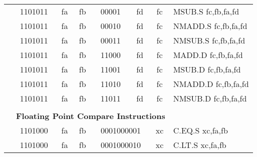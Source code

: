 \begin{table}[p]
\begin{small}
\begin{center}
\begin{tabular}{rcccccccccl}
&
\multicolumn{2}{|c|}{1101011} &
\multicolumn{1}{c|}{fa} &
\multicolumn{1}{c|}{fb} &
\multicolumn{2}{c|}{00001} &
\multicolumn{2}{c|}{fd} &
\multicolumn{1}{c|}{fc} & MSUB.S fc,fb,fa,fd \\
\cline{2-10}
  

&
\multicolumn{2}{|c|}{1101011} &
\multicolumn{1}{c|}{fa} &
\multicolumn{1}{c|}{fb} &
\multicolumn{2}{c|}{00010} &
\multicolumn{2}{c|}{fd} &
\multicolumn{1}{c|}{fc} & NMADD.S fc,fb,fa,fd \\
\cline{2-10}
  

&
\multicolumn{2}{|c|}{1101011} &
\multicolumn{1}{c|}{fa} &
\multicolumn{1}{c|}{fb} &
\multicolumn{2}{c|}{00011} &
\multicolumn{2}{c|}{fd} &
\multicolumn{1}{c|}{fc} & NMSUB.S fc,fb,fa,fd \\
\cline{2-10}
  

&
\multicolumn{2}{|c|}{1101011} &
\multicolumn{1}{c|}{fa} &
\multicolumn{1}{c|}{fb} &
\multicolumn{2}{c|}{11000} &
\multicolumn{2}{c|}{fd} &
\multicolumn{1}{c|}{fc} & MADD.D fc,fb,fa,fd \\
\cline{2-10}
  

&
\multicolumn{2}{|c|}{1101011} &
\multicolumn{1}{c|}{fa} &
\multicolumn{1}{c|}{fb} &
\multicolumn{2}{c|}{11001} &
\multicolumn{2}{c|}{fd} &
\multicolumn{1}{c|}{fc} & MSUB.D fc,fb,fa,fd \\
\cline{2-10}
  

&
\multicolumn{2}{|c|}{1101011} &
\multicolumn{1}{c|}{fa} &
\multicolumn{1}{c|}{fb} &
\multicolumn{2}{c|}{11010} &
\multicolumn{2}{c|}{fd} &
\multicolumn{1}{c|}{fc} & NMADD.D fc,fb,fa,fd \\
\cline{2-10}
  

&
\multicolumn{2}{|c|}{1101011} &
\multicolumn{1}{c|}{fa} &
\multicolumn{1}{c|}{fb} &
\multicolumn{2}{c|}{11011} &
\multicolumn{2}{c|}{fd} &
\multicolumn{1}{c|}{fc} & NMSUB.D fc,fb,fa,fd \\
\cline{2-10}
  

&
\multicolumn{9}{c}{} & \\
&
\multicolumn{9}{c}{\bf Floating Point Compare Instructions} & \\
\cline{2-10}
  

&
\multicolumn{2}{|c|}{1101000} &
\multicolumn{1}{c|}{fa} &
\multicolumn{1}{c|}{fb} &
\multicolumn{4}{c|}{0001000001} &
\multicolumn{1}{c|}{xc} & C.EQ.S xc,fa,fb \\
\cline{2-10}
  

&
\multicolumn{2}{|c|}{1101000} &
\multicolumn{1}{c|}{fa} &
\multicolumn{1}{c|}{fb} &
\multicolumn{4}{c|}{0001000010} &
\multicolumn{1}{c|}{xc} & C.LT.S xc,fa,fb \\
\cline{2-10}
  


\end{tabular}
\end{center}
\end{small}
\end{table}
